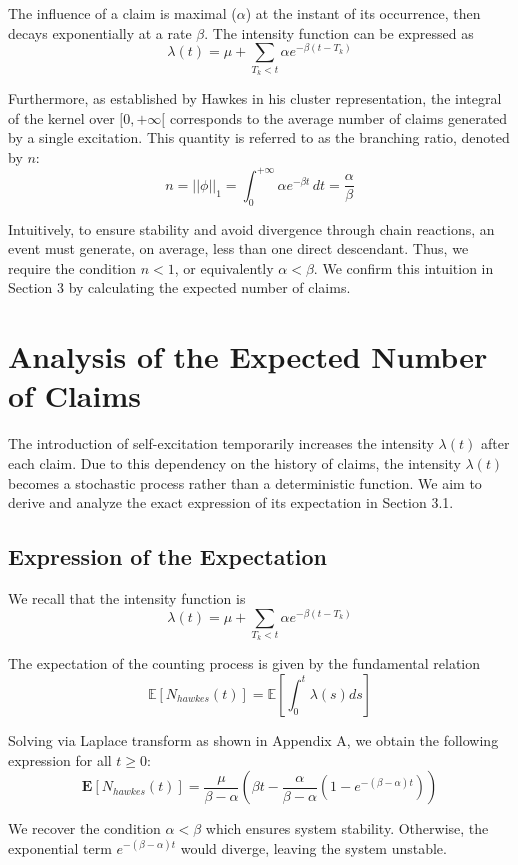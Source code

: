 \documentclass[a4paper,11pt]{article}
\begin{document}
The influence of a claim is maximal ($\alpha$) at the instant of its occurrence, then decays exponentially at a rate $\beta$.
The intensity function can be expressed as
$$\lambda(t) = \mu + \sum_{T_k < t} \alpha e^{-\beta(t - T_k)}$$

Furthermore, as established by Hawkes \cite{hawkes1974} in his cluster representation, the integral of the kernel over $[0, +\infty[$ corresponds to the average number of claims generated by a single excitation. This quantity is referred to as the branching ratio, denoted by $n$:
$$n = ||\phi||_1 = \int_0^{+\infty} \alpha e^{-\beta t} \, dt =\frac{\alpha}{\beta}
$$

Intuitively, to ensure stability and avoid divergence through chain reactions, an event must generate, on average, less than one direct descendant. Thus, we require the condition $n < 1$, or equivalently $\alpha < \beta$. We confirm this intuition in Section 3 by calculating the expected number of claims.


\clearpage
\section{Analysis of the Expected Number of Claims}

The introduction of self-excitation temporarily increases the intensity $\lambda(t)$ after each claim. Due to this dependency on the history of claims, the intensity $\lambda(t)$ becomes a stochastic process rather than a deterministic function. We aim to derive and analyze the exact expression of its expectation in Section 3.1.

\subsection{Expression of the Expectation}

We recall that the intensity function is
$$\lambda(t) = \mu + \sum_{T_k < t} \alpha e^{-\beta(t - T_k)}$$

The expectation of the counting process is given by the fundamental relation
$$\mathbb{E}[N_{hawkes}(t)] = \mathbb{E}\left[\int_0^t \lambda(s) ds\right]$$

Solving via Laplace transform as shown in Appendix A, we obtain the following expression for all $t \ge 0$:
$$\boxed{\mathbf{E}[N_{hawkes}(t)] = \frac{\mu}{\beta - \alpha} \left( \beta t - \frac{\alpha}{\beta - \alpha} (1 - e^{-(\beta - \alpha) t}) \right)}$$

We recover the condition $\alpha < \beta$ which ensures system stability. Otherwise, the exponential term $e^{-(\beta - \alpha) t}$ would diverge, leaving the system unstable.
\end{document}
